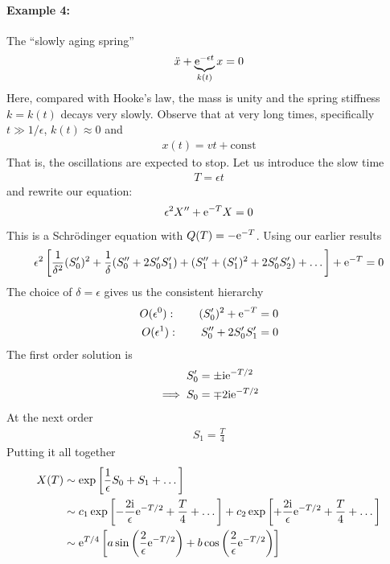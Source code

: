 \paragraph{Example 4:} The ``slowly aging spring''
\begin{gather}
	\ddot{x} + \underbrace{\mathrm{e}^{-\epsilon t}}_{k(t)} x = 0 \label{eqn:wk18-spring-eqn}
\end{gather}
Here, compared with Hooke's law, the mass is unity and the spring stiffness $k = k(t)$ decays very slowly. Observe that at very long times, specifically $t \gg 1/\epsilon$, $k(t) \approx 0$ and
\begin{gather*}
	x(t) = v t + \text{const}
\end{gather*}
That is, the oscillations are expected to stop. Let us introduce the slow time 
\begin{gather*}
	T = \epsilon t
\end{gather*} 
and rewrite our equation:
\begin{gather*}
	\epsilon^2 X'' + \mathrm{e}^{-T} X = 0
\end{gather*}
This is a Schr\"{o}dinger equation with $Q(T) = -\mathrm{e}^{-T}$. Using our earlier results
\begin{gather*}
	\epsilon^2\left[ \frac{1}{\delta^2} (S_0')^2 + \frac{1}{\delta} (S_0'' + 2 S_0' S_1') + (S_1'' + (S_1')^2 + 2 S_0' S_2') + \dots\right] + \mathrm{e}^{-T} = 0
\end{gather*}
The choice of $\delta = \epsilon$ gives us the consistent hierarchy 
\begin{align*}
	O(\epsilon^0): \qquad (S_0')^2 + \mathrm{e}^{-T} = 0 \\
	O(\epsilon^1): \qquad S_0'' + 2 S_0' S_1' = 0
\end{align*}
The first order solution is
\begin{align*}
	S_0' &= \pm \mathrm{i} \mathrm{e}^{-T/2}\\
	\implies S_0 &= \mp 2\mathrm{i} \mathrm{e}^{-T/2}
\end{align*}
At the next order
\begin{align*}
	S_1 = \frac{T}{4}
\end{align*}
Putting it all together
\begin{align}
	X(T) &\sim \exp\left[\frac{1}{\epsilon} S_0 + S_1 + \dots \right] \nonumber \\
	& \sim c_1 \exp\left[-\frac{2 \mathrm{i}}{\epsilon}\mathrm{e}^{-T/2} + \frac{T}{4} + \dots \right] + c_2 \exp\left[+\frac{2 \mathrm{i}}{\epsilon}\mathrm{e}^{-T/2} + \frac{T}{4} + \dots \right] \nonumber \\
	& \sim \mathrm{e}^{T/4} \left[a \sin \left(\frac{2}{\epsilon}\mathrm{e}^{-T/2}\right) + b \cos \left(\frac{2}{\epsilon}\mathrm{e}^{-T/2}\right)\right] \label{eqn:wk18-spring-wkb}
\end{align}
